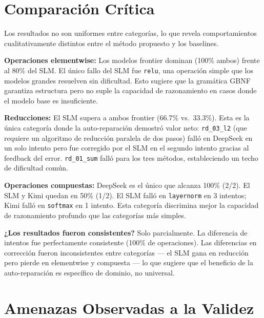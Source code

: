 \documentclass[12pt]{article}
\begin{document}
\section{Comparación Crítica}

Los resultados no son uniformes entre categorías, lo que revela comportamientos
cualitativamente distintos entre el método propuesto y los baselines.

\textbf{Operaciones elementwise:} Los modelos frontier dominan (100\% ambos) frente
al 80\% del SLM. El único fallo del SLM fue \texttt{relu}, una operación simple que
los modelos grandes resuelven sin dificultad. Esto sugiere que la gramática GBNF
garantiza estructura pero no suple la capacidad de razonamiento en casos donde el
modelo base es insuficiente.

\textbf{Reducciones:} El SLM supera a ambos frontier (66.7\% vs.\ 33.3\%). Esta es
la única categoría donde la auto-reparación demostró valor neto: \texttt{rd\_03\_l2}
(que requiere un algoritmo de reducción paralela de dos pasos) falló en DeepSeek en
un solo intento pero fue corregido por el SLM en el segundo intento gracias al
feedback del error. \texttt{rd\_01\_sum} falló para los tres métodos, estableciendo
un techo de dificultad común.

\textbf{Operaciones compuestas:} DeepSeek es el único que alcanza 100\% (2/2).
El SLM y Kimi quedan en 50\% (1/2). El SLM falló en \texttt{layernorm} en 3
intentos; Kimi falló en \texttt{softmax} en 1 intento. Esta categoría discrimina
mejor la capacidad de razonamiento profundo que las categorías más simples.

\textbf{¿Los resultados fueron consistentes?} Solo parcialmente. La diferencia de
intentos fue perfectamente consistente (100\% de operaciones). Las diferencias en
corrección fueron inconsistentes entre categorías — el SLM gana en reducción pero
pierde en elementwise y compuesta — lo que sugiere que el beneficio de la
auto-reparación es específico de dominio, no universal.

\section{Amenazas Observadas a la Validez}
\end{document}
